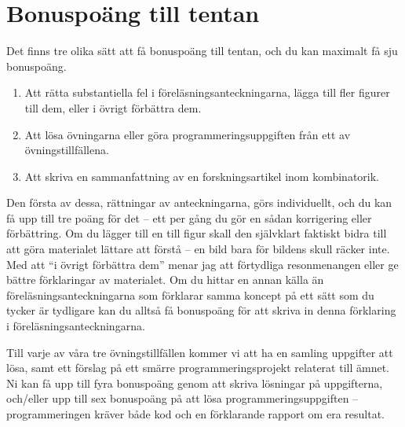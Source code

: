 \documentclass[nobib]{tufte-handout}
\begin{document}
\section{Bonuspoäng till tentan}

Det finns tre olika sätt att få bonuspoäng till tentan, och du kan maximalt få sju bonuspoäng.

\begin{enumerate}
	\item Att rätta substantiella fel i föreläsningsanteckningarna, lägga till fler figurer till dem, eller i övrigt förbättra dem.
	\item Att lösa övningarna eller göra programmeringsuppgiften från ett av övningstillfällena.
	\item Att skriva en sammanfattning av en forskningsartikel inom kombinatorik.
\end{enumerate}

Den första av dessa, rättningar av anteckningarna, görs individuellt, och du kan få upp till tre poäng för det -- ett per gång du gör en sådan korrigering eller förbättring. Om du lägger till en till figur skall den självklart faktiskt bidra till att göra materialet lättare att förstå -- en bild bara för bildens skull räcker inte. Med att ``i övrigt förbättra dem'' menar jag att förtydliga resonmenangen eller ge bättre förklaringar av materialet. Om du hittar en annan källa än föreläsningsanteckningarna som förklarar samma koncept på ett sätt som du tycker är tydligare kan du alltså få bonuspoäng för att skriva in denna förklaring i föreläsningsanteckningarna.

Till varje av våra tre övningstillfällen kommer vi att ha en samling uppgifter att lösa, samt ett förslag på ett smärre programmeringsprojekt relaterat till ämnet. Ni kan få upp till fyra bonuspoäng genom att skriva lösningar på uppgifterna, och/eller upp till sex bonuspoäng på att lösa programmeringsuppgiften -- programmeringen kräver både kod och en förklarande rapport om era resultat.
\end{document}
